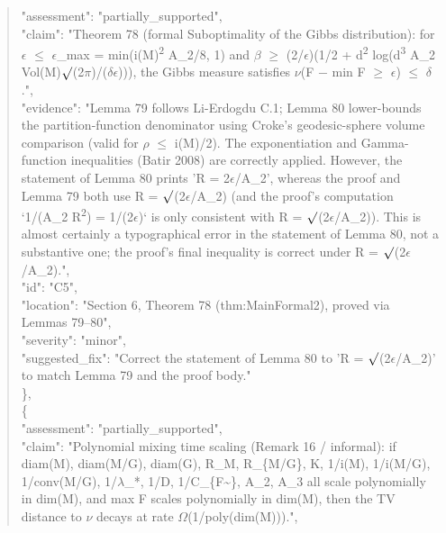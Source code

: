 \documentclass[11pt]{article}
\begin{document}
\begin{quote}
      "assessment": "partially\_supported",\\
      "claim": "Theorem 78 (formal Suboptimality of the Gibbs distribution): for \ensuremath{\epsilon} \ensuremath{\le} \ensuremath{\epsilon}\_max = min(i(M)\textsuperscript{2} A\_2/8, 1) and \ensuremath{\beta} \ensuremath{\ge} (2/\ensuremath{\epsilon})(1/2 + d\textsuperscript{2} log(d\textsuperscript{3} A\_2 Vol(M)\ensuremath{\surd}(2\ensuremath{\pi})/(\ensuremath{\delta}\ensuremath{\epsilon}))), the Gibbs measure satisfies \ensuremath{\nu}(F \ensuremath{-} min F \ensuremath{\ge} \ensuremath{\epsilon}) \ensuremath{\le} \ensuremath{\delta}.",\\
      "evidence": "Lemma 79 follows Li-Erdogdu C.1; Lemma 80 lower-bounds the partition-function denominator using Croke's geodesic-sphere volume comparison (valid for \ensuremath{\rho} \ensuremath{\le} i(M)/2). The exponentiation and Gamma-function inequalities (Batir 2008) are correctly applied. However, the statement of Lemma 80 prints 'R = 2\ensuremath{\epsilon}/A\_2', whereas the proof and Lemma 79 both use R = \ensuremath{\surd}(2\ensuremath{\epsilon}/A\_2) (and the proof's computation `1/(A\_2 R\textsuperscript{2}) = 1/(2\ensuremath{\epsilon})` is only consistent with R = \ensuremath{\surd}(2\ensuremath{\epsilon}/A\_2)). This is almost certainly a typographical error in the statement of Lemma 80, not a substantive one; the proof's final inequality is correct under R = \ensuremath{\surd}(2\ensuremath{\epsilon}/A\_2).",\\
      "id": "C5",\\
      "location": "Section 6, Theorem 78 (thm:MainFormal2), proved via Lemmas 79--80",\\
      "severity": "minor",\\
      "suggested\_fix": "Correct the statement of Lemma 80 to 'R = \ensuremath{\surd}(2\ensuremath{\epsilon}/A\_2)' to match Lemma 79 and the proof body."\\
    \},\\
    \{\\
      "assessment": "partially\_supported",\\
      "claim": "Polynomial mixing time scaling (Remark 16 / informal): if diam(M), diam(M/G), diam(G), R\_M, R\_\{M/G\}, K, 1/i(M), 1/i(M/G), 1/conv(M/G), 1/\ensuremath{\lambda}\_*, 1/D, 1/C\_\{F\~{}\}, A\_2, A\_3 all scale polynomially in dim(M), and max F scales polynomially in dim(M), then the TV distance to \ensuremath{\nu} decays at rate \ensuremath{\Omega}(1/poly(dim(M))).",\\

\end{quote}
\end{document}
